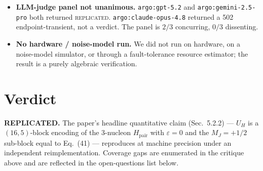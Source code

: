 \documentclass[11pt]{article}
\begin{document}
\begin{itemize}
selection + 1 validation ancillas in the encoding projection (matching the
paper's $m=5$), plus 2 auxiliary qubits that the paper describes as uncomputed.
We verified numerically that those auxiliaries return to $|00\rangle$ on the
encoding-input subspace (isometry check), so the reported $m=5$ is honest, but a
reader who counts \emph{all} ancillas would say $m=7$. The paper's convention is
standard; we flag this only for transparency.
\item \textbf{LLM-judge panel not unanimous.} \texttt{argo:gpt-5.2} and
\texttt{argo:gemini-2.5-pro} both returned \textsc{replicated}.
\texttt{argo:claude-opus-4.8} returned a 502 endpoint-transient, not a verdict.
The panel is $2/3$ concurring, $0/3$ dissenting.
\item \textbf{No hardware / noise-model run.} We did not run on hardware, on a
noise-model simulator, or through a fault-tolerance resource estimator; the
result is a purely algebraic verification.
\end{itemize}

\section{Verdict}

\textcolor{green!50!black}{\textbf{REPLICATED.}} The paper's headline quantitative
claim (Sec.~5.2.2) --- $U_H$ is a $(16,5)$-block encoding of the 3-nucleon
$H_{\text{pair}}$ with $\varepsilon = 0$ and the $M_J=+1/2$ sub-block equal to
Eq.~(41) --- reproduces at machine precision under an independent
reimplementation. Coverage gaps are enumerated in the critique above and are
reflected in the open-questions list below.


\end{document}
